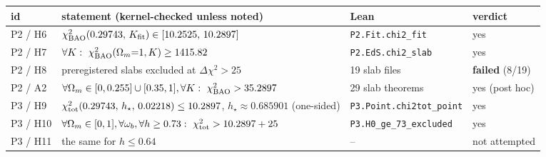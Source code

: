 \begin{tabular}{@{}l p{6.0cm} p{4.0cm} l@{}}\toprule
id & statement (kernel-checked unless noted) & Lean & verdict \\
\midrule
P2 / H6 & $\chi^2_{\rm BAO}(0.29743,\,K_{\rm fit})\in[10.2525,\,10.2897]$ & \texttt{P2.Fit.chi2\_fit} & yes \\
P2 / H7 & $\forall K:\ \chi^2_{\rm BAO}(\Omega_m{=}1,K)\ge 1415.82$ & \texttt{P2.EdS.chi2\_slab} & yes \\
P2 / H8 & preregistered slabs excluded at $\Delta\chi^2>25$ & 19 slab files & \textbf{failed} (8/19) \\
P2 / A2 & $\forall\Omega_m\in[0,0.255]\cup[0.35,1],\forall K:\ \chi^2_{\rm BAO}>35.2897$ & 29 slab theorems & yes (post hoc) \\
P3 / H9 & $\chi^2_{\rm tot}(0.29743,\,h_\star,\,0.02218)\le 10.2897$, $h_\star\approx0.685901$ (one-sided) & \texttt{P3.Point.chi2tot\_point} & yes \\
P3 / H10 & $\forall\Omega_m\in[0,1],\forall\omega_b,\forall h\ge0.73:\ \chi^2_{\rm tot}>10.2897+25$ & \texttt{P3.H0\_ge\_73\_excluded} & yes \\
P3 / H11 & the same for $h\le0.64$ & -- & not attempted \\
\bottomrule
\end{tabular}
